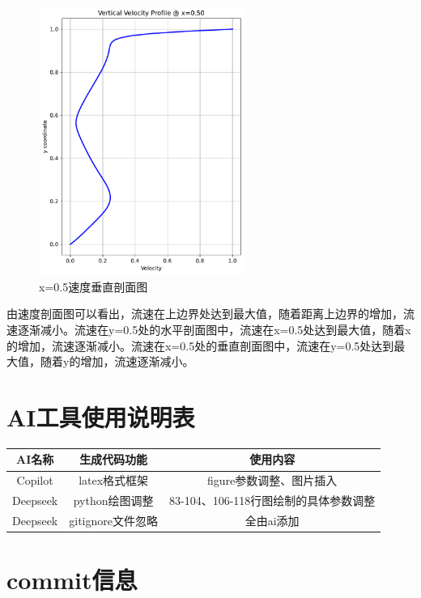 \documentclass[12pt,a4paper]{article}
\begin{document}
\begin{figure}[H]
    \centering
    \includegraphics[width=0.6\textwidth]{3_vertical_profile.pdf}
    \caption{x=0.5速度垂直剖面图}
    \label{fig:velocity_profile}
\end{figure}
由速度剖面图可以看出，流速在上边界处达到最大值，随着距离上边界的增加，流速逐渐减小。流速在y=0.5处的水平剖面图中，流速在x=0.5处达到最大值，随着x的增加，流速逐渐减小。流速在x=0.5处的垂直剖面图中，流速在y=0.5处达到最大值，随着y的增加，流速逐渐减小。


\section{AI工具使用说明表}
\begin{table}[!htbp]
    \centering
    \begin{tabular}{|c|c|c|}
        \hline
        \textbf{AI名称} & \textbf{生成代码功能} & \textbf{使用内容} \\
        \hline
        Copilot & latex格式框架 & figure参数调整、图片插入\\
        \hline
        Deepseek & python绘图调整 & 83-104、106-118行图绘制的具体参数调整\\
        \hline
        Deepseek & gitignore文件忽略 & 全由ai添加\\
        \hline
\end{tabular}
\end{table}
\section{commit信息}
\end{document}

